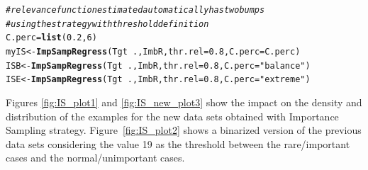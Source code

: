 \documentclass[10pt,a4paper]{article}\usepackage[]{graphicx}\usepackage[]{color}
\makeatletter
\newcommand{\hlnum}[1]{\textcolor[rgb]{0.686,0.059,0.569}{#1}}%
\newcommand{\hlstr}[1]{\textcolor[rgb]{0.192,0.494,0.8}{#1}}%
\newcommand{\hlcom}[1]{\textcolor[rgb]{0.678,0.584,0.686}{\textit{#1}}}%
\newcommand{\hlopt}[1]{\textcolor[rgb]{0,0,0}{#1}}%
\newcommand{\hlstd}[1]{\textcolor[rgb]{0.345,0.345,0.345}{#1}}%
\newcommand{\hlkwb}[1]{\textcolor[rgb]{0.69,0.353,0.396}{#1}}%
\newcommand{\hlkwc}[1]{\textcolor[rgb]{0.333,0.667,0.333}{#1}}%
\newcommand{\hlkwd}[1]{\textcolor[rgb]{0.737,0.353,0.396}{\textbf{#1}}}%
\newenvironment{kframe}{%
 \def\at@end@of@kframe{}%
 \ifinner\ifhmode%
  \def\at@end@of@kframe{\end{minipage}}%
  \begin{minipage}{\columnwidth}%
 \fi\fi%
 \def\FrameCommand##1{\hskip\@totalleftmargin \hskip-\fboxsep
 \colorbox{shadecolor}{##1}\hskip-\fboxsep
     \hskip-\linewidth \hskip-\@totalleftmargin \hskip\columnwidth}%
 \MakeFramed {\advance\hsize-\width
   \@totalleftmargin\z@ \linewidth\hsize
   \@setminipage}}%
 {\par\unskip\endMakeFramed%
 \at@end@of@kframe}
\newenvironment{knitrout}{}{} %
\makeatother
\begin{document}
\begin{knitrout}\footnotesize
{}\color{fgcolor}\begin{kframe}
\begin{alltt}
\hlcom{# relevance function estimated automatically has two bumps}
\hlcom{# using the strategy with threshold definition}
\hlstd{C.perc}\hlkwb{=}\hlkwd{list}\hlstd{(}\hlnum{0.2}\hlstd{,}\hlnum{6}\hlstd{)}
\hlstd{myIS} \hlkwb{<-} \hlkwd{ImpSampRegress}\hlstd{(Tgt}\hlopt{~}\hlstd{., ImbR,} \hlkwc{thr.rel}\hlstd{=}\hlnum{0.8}\hlstd{,}\hlkwc{C.perc}\hlstd{=C.perc)}
\hlstd{ISB} \hlkwb{<-} \hlkwd{ImpSampRegress}\hlstd{(Tgt}\hlopt{~}\hlstd{., ImbR,} \hlkwc{thr.rel}\hlstd{=}\hlnum{0.8}\hlstd{,} \hlkwc{C.perc}\hlstd{=}\hlstr{"balance"}\hlstd{)}
\hlstd{ISE} \hlkwb{<-} \hlkwd{ImpSampRegress}\hlstd{(Tgt}\hlopt{~}\hlstd{., ImbR,} \hlkwc{thr.rel}\hlstd{=}\hlnum{0.8}\hlstd{,} \hlkwc{C.perc}\hlstd{=}\hlstr{"extreme"}\hlstd{)}
\end{alltt}
\end{kframe}
\end{knitrout}

Figures \ref{fig:IS_plot1} and \ref{fig:IS_new_plot3} show the impact on the density and distribution of the examples for the new data sets obtained with Importance Sampling strategy. Figure~\ref{fig:IS_plot2} shows a binarized version of the previous data sets considering the value 19 as the threshold between the rare/important cases and the normal/unimportant cases. 
\end{document}
